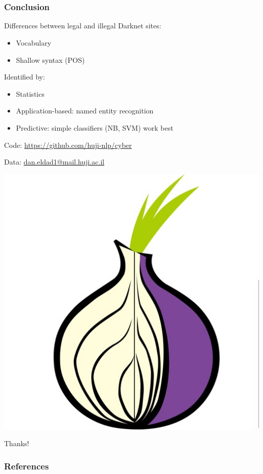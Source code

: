 \documentclass[t,xcolor={svgnames,table}]{beamer}
\begin{document}
\section*{}

\begin{frame}
	\frametitle{Conclusion}
	Differences between legal and illegal Darknet sites:	
	\begin{itemize}\setlength\itemsep{1em}
	\item Vocabulary
	\item Shallow syntax (POS)
	\end{itemize}
	\vfill
	\pause
	
	Identified by:
	\begin{itemize}\setlength\itemsep{1em}
	\item Statistics
	\item Application-based: named entity recognition
	\item Predictive: simple classifiers (NB, SVM) work best
	\end{itemize}
	\vfill
	\pause
	
	\begin{minipage}{.7\textwidth}
	Code: {\color{blue}\url{https://github.com/huji-nlp/cyber}}
	
	Data: {\color{blue}\url{dan.eldad1@mail.huji.ac.il}}
	\end{minipage}
	\pause
	\begin{minipage}{.28\textwidth}
	\centering\vspace{-2cm}
	\includegraphics[width=.8\textwidth]{onion.jpg}
	
	Thanks!
	\end{minipage}
\end{frame}

\begin{frame}[allowframebreaks]
\frametitle{References}

\tiny
\end{frame}
\end{document}
